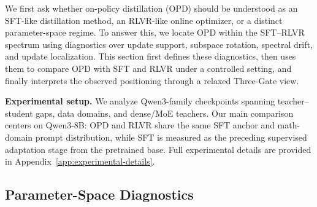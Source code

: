 \documentclass{llmxive}
\begin{document}




We first ask whether on-policy distillation (OPD) should be understood as an SFT-like distillation
method, an RLVR-like online optimizer, or a distinct parameter-space
regime. To answer this, we locate OPD within the SFT--RLVR spectrum using
diagnostics over update support, subspace rotation, spectral drift, and
update localization. This section first defines these diagnostics, then
uses them to compare OPD with SFT and RLVR under a controlled setting, and
finally interprets the observed positioning through a relaxed Three-Gate
view.

\textbf{Experimental setup.}
We analyze Qwen3-family checkpoints \cite{yang2025qwen3technicalreport} spanning teacher--student gaps, data domains, 
and dense/MoE teachers. Our main comparison centers on Qwen3-8B: OPD and RLVR share the same SFT anchor and math-domain prompt distribution, while SFT is measured as the preceding supervised adaptation stage from the pretrained base. Full
experimental details are provided in Appendix~\ref{app:experimental-details}.




\subsection{Parameter-Space Diagnostics}
\end{document}
